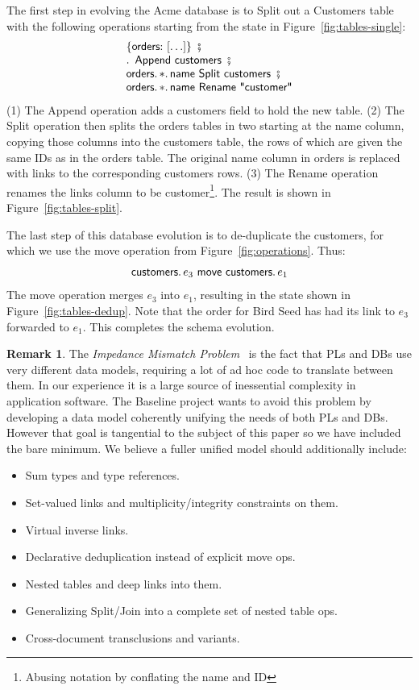 \documentclass[english,submission]{programming}
\theoremstyle{definition}
\newtheorem*{remark}{Remark}
\DeclareMathOperator{\exec}{\ \fatsemi\ \ }
\newcommand{\is}{{:}\ }
\newcommand{\quotedstring}[1]{\textsf{\textquotedbl{#1}\textquotedbl}}
\begin{document}
The first step in evolving the Acme database is to \textsf{Split} out a \textsf{Customers} table with the following operations starting from the state in Figure~\ref{fig:tables-single}:
\[
\begin{array}{l}
\{ \textsf{orders}\is [ \ldots ]\} \exec\\
\ldotp \textsf{ Append } \textsf{customers} \exec \\
\textsf{orders}\ldotp * \ldotp \textsf{name Split customers} \exec \\
\textsf{orders}\ldotp * \ldotp \textsf{name Rename } \quotedstring{customer}
\end{array}\]
(1) The \textsf{Append} operation adds a \textsf{customers} field to hold the new table. (2) The \textsf{Split} operation then splits the \textsf{orders} tables in two starting at the \textsf{name} column, copying those columns into the \textsf{customers} table, the rows of which are given the same IDs as in the \textsf{orders} table.
The original \textsf{name} column in \textsf{orders} is replaced with links to the corresponding \textsf{customers} rows.
(3) The \textsf{Rename} operation renames the links column to be \textsf{customer}\footnote{Abusing notation by conflating the name and ID}.
The result is shown in Figure~\ref{fig:tables-split}.

The last step of this database evolution is to de-duplicate the customers, for which we use the \textsf{move} operation from Figure~\ref{fig:operations}. Thus:
\[
\textsf{customers}\ldotp e_3 \textsf{ move } \textsf{customers}\ldotp e_1
\]
The \textsf{move} operation merges $e_3$ into $e_1$, resulting in the state shown in  Figure~\ref{fig:tables-dedup}. Note that the order for Bird Seed has had its link to $e_3$ forwarded to $e_1$. This completes the schema evolution.

\begin{remark}
  The \textit{Impedance Mismatch Problem}~\cite{Chen1996} is the fact that PLs and DBs use very different data models, requiring a lot of ad hoc code to translate between them. In our experience it is a large source of inessential complexity in application software. The Baseline project wants to avoid this problem by developing a data model coherently unifying the needs of both PLs and DBs. However that goal is tangential to the subject of this paper so we have included the bare minimum. We believe a fuller unified model should additionally include:
  \begin{itemize}
    \item Sum types and type references.
    \item Set-valued links and multiplicity/integrity constraints on them.
    \item Virtual inverse links.
    \item Declarative deduplication instead of explicit \textsf{move} ops.
    \item Nested tables and deep links into them.
    \item Generalizing Split/Join into a complete set of nested table ops.
    \item Cross-document transclusions and variants.
  \end{itemize}
\end{remark}
\end{document}
